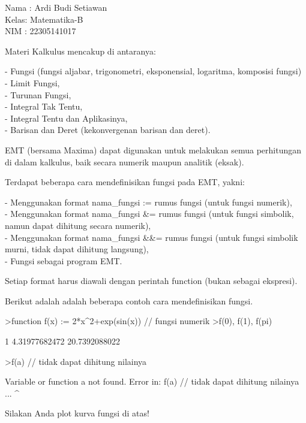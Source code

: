 \documentclass{article}
\begin{document}
\begin{eulernotebook}
\eulersubheading{}
\begin{eulercomment}
Nama : Ardi Budi Setiawan\\
Kelas: Matematika-B\\
NIM  : 22305141017

\begin{eulercomment}
\begin{eulercomment}
Materi Kalkulus mencakup di antaranya:

- Fungsi (fungsi aljabar, trigonometri, eksponensial, logaritma,
komposisi fungsi)\\
- Limit Fungsi,\\
- Turunan Fungsi,\\
- Integral Tak Tentu,\\
- Integral Tentu dan Aplikasinya,\\
- Barisan dan Deret (kekonvergenan barisan dan deret).

EMT (bersama Maxima) dapat digunakan untuk melakukan semua perhitungan
di dalam kalkulus, baik secara numerik maupun analitik (eksak).

\end{eulercomment}
\begin{eulercomment}
Terdapat beberapa cara mendefinisikan fungsi pada EMT, yakni:

- Menggunakan format nama\_fungsi := rumus fungsi (untuk fungsi
numerik),\\
- Menggunakan format nama\_fungsi \&= rumus fungsi (untuk fungsi
simbolik, namun dapat dihitung secara numerik),\\
- Menggunakan format nama\_fungsi \&\&= rumus fungsi (untuk fungsi
simbolik murni, tidak dapat dihitung langsung),\\
- Fungsi sebagai program EMT.

Setiap format harus diawali dengan perintah function (bukan sebagai
ekspresi).

Berikut adalah adalah beberapa contoh cara mendefinisikan fungsi.
\end{eulercomment}
\begin{eulerprompt}
>function f(x) := 2*x^2+exp(sin(x)) // fungsi numerik
>f(0), f(1), f(pi)
\end{eulerprompt}
\begin{euleroutput}
  1
  4.31977682472
  20.7392088022
\end{euleroutput}
\begin{eulerprompt}
>f(a) // tidak dapat dihitung nilainya
\end{eulerprompt}
\begin{euleroutput}
  Variable or function a not found.
  Error in:
  f(a) // tidak dapat dihitung nilainya ...
     ^
\end{euleroutput}
\begin{eulercomment}
Silakan Anda plot kurva fungsi di atas!


\end{eulercomment}
\end{eulercomment}
\end{eulercomment}
\end{eulernotebook}
\end{document}
